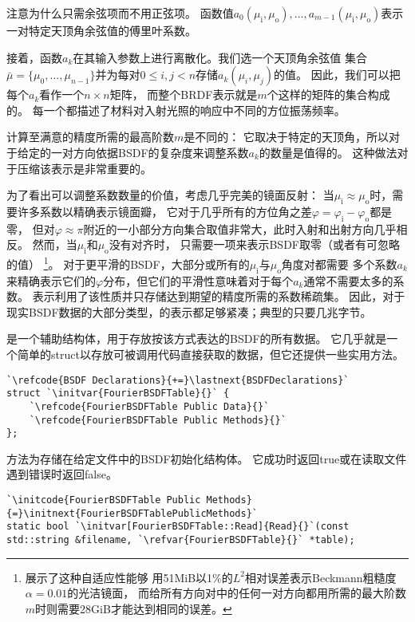 注意为什么只需余弦项而不用正弦项。
函数值$a_0(\mu_{\mathrm{i}},\mu_{\mathrm{o}}),\dots,a_{m-1}(\mu_{\mathrm{i}},\mu_{\mathrm{o}})$表示
一对特定天顶角余弦值的傅里叶系数。

接着，函数$a_k$在其输入参数上进行离散化。我们选一个天顶角余弦值
集合$\bar{\mu}=\{\mu_0,\dots,\mu_{n-1}\}$并为每对$0\le i,j<n$存储$a_k(\mu_i,\mu_j)$的值。
因此，我们可以把每个$a_k$看作一个$n\times n$矩阵，
而整个BRDF表示就是$m$个这样的矩阵的集合构成的。
每一个都描述了材料对入射光照的响应中不同的方位振荡频率。

计算至满意的精度所需的最高阶数$m$是不同的：
它取决于特定的天顶角，所以对于给定的一对方向依据BSDF的复杂度来调整系数$a_k$的数量是值得的。
这种做法对于压缩该表示是非常重要的。

为了看出可以调整系数数量的价值，考虑几乎完美的镜面反射：
当$\mu_{\mathrm{i}}\approx\mu_{\mathrm{o}}$时，需要许多系数以精确表示镜面瓣，
它对于几乎所有的方位角之差$\varphi=\varphi_{\mathrm{i}}-\varphi_{\mathrm{o}}$都是零，
但对$\varphi\approx\pi$附近的一小部分方向集合取值非常大，此时入射和出射方向几乎相反。
然而，当$\mu_{\mathrm{i}}$和$\mu_{\mathrm{o}}$没有对齐时，
只需要一项来表示BSDF取零（或者有可忽略的值）
\footnote{\citet{10.1145/2601097.2601139}展示了这种自适应性能够
用51MiB以1\%的$L^2$相对误差表示Beckmann粗糙度$\alpha=0.01$的光洁镜面，
而给所有方向对中的任何一对方向都用所需的最大阶数$m$时则需要28GiB才能达到相同的误差。}。
对于更平滑的BSDF，大部分或所有的$\mu_{\mathrm{i}}$与$\mu_{\mathrm{o}}$角度对都需要
多个系数$a_k$来精确表示它们的$\varphi$分布，但它们的平滑性意味着对于每个$a_k$通常不需要太多的系数。
表示利用了该性质并只存储达到期望的精度所需的系数稀疏集。
因此，对于现实BSDF数据的大部分类型，的表示都足够紧凑；典型的只要几兆字节。

是一个辅助结构体，用于存放按该方式表达的BSDF的所有数据。
它几乎就是一个简单的{\ttfamily struct}以存放可被调用代码直接获取的数据，但它还提供一些实用方法。
\begin{lstlisting}
`\refcode{BSDF Declarations}{+=}\lastnext{BSDFDeclarations}`
struct `\initvar{FourierBSDFTable}{}` {
    `\refcode{FourierBSDFTable Public Data}{}`
    `\refcode{FourierBSDFTable Public Methods}{}`
};
\end{lstlisting}

方法为存储在给定文件中的BSDF初始化结构体。
它成功时返回{\ttfamily true}或在读取文件遇到错误时返回{\ttfamily false}。
\begin{lstlisting}
`\initcode{FourierBSDFTable Public Methods}{=}\initnext{FourierBSDFTablePublicMethods}`
static bool `\initvar[FourierBSDFTable::Read]{Read}{}`(const std::string &filename, `\refvar{FourierBSDFTable}{}` *table);
\end{lstlisting}

